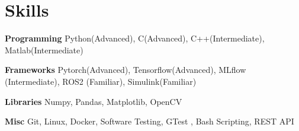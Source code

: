 
\section{Skills}
  \vspace{2pt}
  \resumeSubHeadingListStart
    \small{\item{

    \textbf{\color{MidnightBlue}Programming}{ Python(Advanced), C(Advanced), C++(Intermediate), Matlab(Intermediate)} \\ \vspace{3pt} %

    \textbf{\color{MidnightBlue}Frameworks}{ Pytorch(Advanced), Tensorflow(Advanced), MLflow (Intermediate)}, ROS2 (Familiar), Simulink(Familiar)\\ \vspace{3pt}

    \textbf{\color{MidnightBlue}Libraries}{ Numpy, Pandas, Matplotlib, OpenCV} \\ \vspace{3pt} %



    \textbf{\color{MidnightBlue}Misc}{ Git, Linux, Docker, Software Testing, GTest , Bash Scripting, REST API} \\ \vspace{3pt} %
            
    }}
  \resumeSubHeadingListEnd
